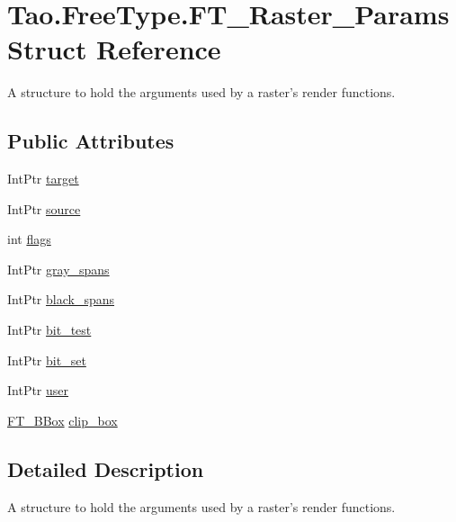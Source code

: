 \hypertarget{struct_tao_1_1_free_type_1_1_f_t___raster___params}{
\section{Tao.FreeType.FT\_\-Raster\_\-Params Struct Reference}
\label{struct_tao_1_1_free_type_1_1_f_t___raster___params}
}


A structure to hold the arguments used by a raster's render functions.  


\subsection*{Public Attributes}
\begin{DoxyCompactItemize}
\item 
IntPtr \hyperlink{struct_tao_1_1_free_type_1_1_f_t___raster___params_a1bc733c72fdcfbd3633d713bd23ae9dd}{target}
\item 
IntPtr \hyperlink{struct_tao_1_1_free_type_1_1_f_t___raster___params_a5395c42a2d2e095114d3e2fe9ac8bcd1}{source}
\item 
int \hyperlink{struct_tao_1_1_free_type_1_1_f_t___raster___params_af9def81ae7d4afa4bb8c093ffd6bae9c}{flags}
\item 
IntPtr \hyperlink{struct_tao_1_1_free_type_1_1_f_t___raster___params_ab03ec8354d613a7313966ee6fe7782bb}{gray\_\-spans}
\item 
IntPtr \hyperlink{struct_tao_1_1_free_type_1_1_f_t___raster___params_acb6dba903012fc569dd5fb8ab96fd6a5}{black\_\-spans}
\item 
IntPtr \hyperlink{struct_tao_1_1_free_type_1_1_f_t___raster___params_ad961e5db68363658b25f01c18e3f988d}{bit\_\-test}
\item 
IntPtr \hyperlink{struct_tao_1_1_free_type_1_1_f_t___raster___params_a056708c14d58a9d152af84dadb036866}{bit\_\-set}
\item 
IntPtr \hyperlink{struct_tao_1_1_free_type_1_1_f_t___raster___params_acb2db82640119e65c5c409d385ab2084}{user}
\item 
\hyperlink{struct_tao_1_1_free_type_1_1_f_t___b_box}{FT\_\-BBox} \hyperlink{struct_tao_1_1_free_type_1_1_f_t___raster___params_ac39d638ef72bf6f2d782ba42208e7d30}{clip\_\-box}
\end{DoxyCompactItemize}


\subsection{Detailed Description}
A structure to hold the arguments used by a raster's render functions. 

